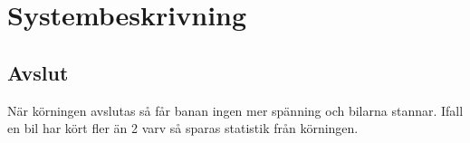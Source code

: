 \section{Systembeskrivning}







\subsection{Avslut}

När körningen avslutas så får banan ingen mer spänning och bilarna stannar.
Ifall en bil har kört fler än 2 varv så sparas statistik från körningen. 
